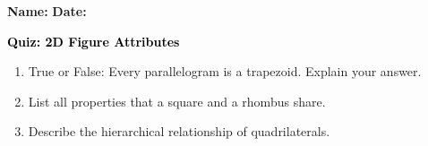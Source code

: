 \documentclass[12pt, letterpaper, fleqn]{article}
\begin{document}
\textbf{Name:} \underline{\hspace{5cm}}
\hfill
\textbf{Date:} \underline{\hspace{3cm}}\\

\begin{tcolorbox}[colback=customteal!20]
    \large\textcolor{black}{\textbf{Quiz: 2D Figure Attributes}}
\end{tcolorbox}
\begin{enumerate}[itemsep=3.5cm, leftmargin=0.6cm]
\item True or False: Every parallelogram is a trapezoid. Explain your answer.
\vspace{3.5cm}
\item List all properties that a square and a rhombus share.
\vspace{3.5cm}
\item Describe the hierarchical relationship of quadrilaterals.
\end{enumerate}
\end{document}
